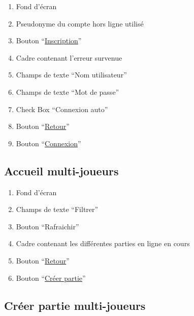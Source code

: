 \documentclass{report}
\begin{document}
		\hypertarget{Connexion multi-joueurs}{}
		\label{Connexion multi-joueurs}
	
		
		
		\begin{enumerate}
		  \item Fond d'écran
		  \item Pseudonyme du compte hors ligne utilisé
		  \item Bouton ``\hyperlink{Creation compte multi-joueurs}{Inscription}''
		  \item Cadre contenant l'erreur survenue
		  \item Champs de texte ``Nom utilisateur''
		  \item Champs de texte ``Mot de passe''
		  \item Check Box ``Connexion auto''
		  \item Bouton ``\hyperlink{Page d'accueil}{Retour}''
		  \item Bouton ``\hyperlink{Accueil multi-joueurs}{Connexion}''
		\end{enumerate}
		
		
\newpage

	\subsection{Accueil multi-joueurs}

		\hypertarget{Accueil multi-joueurs}{}
		\label{Accueil multi-joueurs}
	
		
		
		\begin{enumerate}
		  \item Fond d'écran
		  \item Champs de texte ``Filtrer''
		  \item Bouton ``Rafraichir''
		  \item Cadre contenant les différentes parties en ligne en cours
		  \item Bouton ``\hyperlink{Page d'accueil}{Retour}''
		  \item Bouton ``\hyperlink{Creer partie multi-joueurs}{Créer partie}''
		\end{enumerate}
	
\newpage

	\subsection{Créer partie multi-joueurs}
	
\end{document}
